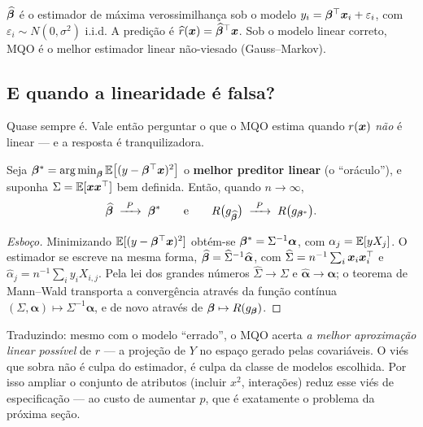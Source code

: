 \documentclass[11pt,a4paper]{article}
\begin{document}
\begin{observacao}
$\widehat{\bm{\beta}}$ é o estimador de máxima verossimilhança sob o modelo
$y_i = \bm{\beta}^\top\bm{x}_i + \varepsilon_i$, com $\varepsilon_i\sim N(0,\sigma^2)$
i.i.d. A predição é $\widehat{r}(\bm{x})=\widehat{\bm{\beta}}^\top\bm{x}$. Sob o modelo linear
correto, MQO é o melhor estimador linear não-viesado (Gauss--Markov).
\end{observacao}

\subsection{E quando a linearidade é falsa?}
Quase sempre é. Vale então perguntar o que o MQO estima quando $r(\bm{x})$ \emph{não} é
linear --- e a resposta é tranquilizadora.

\begin{teorema}\label{teo:oraculo}
Seja $\bbeta^*=\argmin_{\bbeta}\E\big[(y-\bbeta^\top\x)^2\big]$ o
\textbf{melhor preditor linear} (o ``oráculo''), e suponha
$\Sigma=\mathbb{E}[\bm{x}\bm{x}^\top]$ bem definida. Então, quando $n\to\infty$,
\[
  \widehat{\bm{\beta}} \;\xrightarrow{\ P\ }\; \bm{\beta}^*
  \qquad\text{e}\qquad
  R\big(g_{\widehat{\bm{\beta}}}\big) \;\xrightarrow{\ P\ }\; R\big(g_{\bm{\beta}^*}\big).
\]
\end{teorema}
\begin{proof}[Esboço]
Minimizando $\mathbb{E}[(y-\bm{\beta}^\top\bm{x})^2]$ obtém-se $\bm{\beta}^*=\Sigma^{-1}\bm{\alpha}$, com
$\alpha_j=\mathbb{E}[yX_j]$. O estimador se escreve na mesma forma,
$\widehat{\bm{\beta}}=\widehat\Sigma^{-1}\widehat{\bm{\alpha}}$, com
$\widehat\Sigma=n^{-1}\sum_i\bm{x}_i\bm{x}_i^\top$ e
$\widehat\alpha_j=n^{-1}\sum_i y_iX_{i,j}$. Pela lei dos grandes números
$\widehat\Sigma\to\Sigma$ e $\widehat{\bm{\alpha}}\to\bm{\alpha}$; o teorema de Mann--Wald
transporta a convergência através da função contínua
$(\Sigma,\bm{\alpha})\mapsto\Sigma^{-1}\bm{\alpha}$, e de novo através de
$\bm{\beta}\mapsto R(g_{\bm{\beta}})$.
\end{proof}

\begin{ideia}
Traduzindo: mesmo com o modelo ``errado'', o MQO acerta \emph{a melhor aproximação
linear possível} de $r$ --- a projeção de $Y$ no espaço gerado pelas covariáveis. O
viés que sobra não é culpa do estimador, é culpa da classe de modelos escolhida.
Por isso ampliar o conjunto de atributos (incluir $x^2$, interações) reduz esse viés
de especificação --- ao custo de aumentar $p$, que é exatamente o problema da próxima
seção.
\end{ideia}
\end{document}
